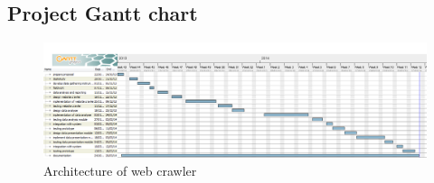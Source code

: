 \subsection{Project Gantt chart}
\begin{figure}[H]
	\includegraphics[width=\linewidth,scale=0.5]{../static/img/gantt.png}
	\caption{Architecture of web crawler}
\end{figure}





